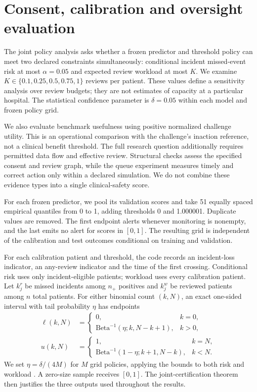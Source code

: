 \section*{Consent, calibration and oversight evaluation}

The joint policy analysis asks whether a frozen predictor and threshold policy can meet two declared constraints simultaneously: conditional incident missed-event risk at most $\alpha=0.05$ and expected review workload at most $K$. We examine $K\in\{0.1,0.25,0.5,0.75,1\}$ reviews per patient. These values define a sensitivity analysis over review budgets; they are not estimates of capacity at a particular hospital. The statistical confidence parameter is $\delta=0.05$ within each model and frozen policy grid.

We also evaluate benchmark usefulness using positive normalized challenge utility. This is an operational comparison with the challenge's inaction reference, not a clinical benefit threshold. The full research question additionally requires permitted data flow and effective review. Structural checks assess the specified consent and review graph, while the queue experiment measures timely and correct action only within a declared simulation. We do not combine these evidence types into a single clinical-safety score.

For each frozen predictor, we pool its validation scores and take 51 equally spaced empirical quantiles from 0 to 1, adding thresholds 0 and 1.000001. Duplicate values are removed. The first endpoint alerts whenever monitoring is nonempty, and the last emits no alert for scores in $[0,1]$. The resulting grid is independent of the calibration and test outcomes conditional on training and validation.

For each calibration patient and threshold, the code records an incident-loss indicator, an any-review indicator and the time of the first crossing. Conditional risk uses only incident-eligible patients; workload uses every calibration patient. Let $k_j^r$ be missed incidents among $n_+$ positives and $k_j^w$ be reviewed patients among $n$ total patients. For either binomial count $(k,N)$, an exact one-sided interval with tail probability $\eta$ has endpoints
\begin{align*}
 \ell(k,N)&=\begin{cases}0,&k=0,\\
 \mathrm{Beta}^{-1}(\eta;k,N-k+1),&k>0,
 \end{cases}\\
 u(k,N)&=\begin{cases}1,&k=N,\\
 \mathrm{Beta}^{-1}(1-\eta;k+1,N-k),&k<N.
 \end{cases}
\end{align*}
We set $\eta=\delta/(4M)$ for $M$ grid policies, applying the bounds to both risk and workload \citep{clopper}. A zero-size sample receives $[0,1]$. The joint-certification theorem then justifies the three outputs used throughout the results.

